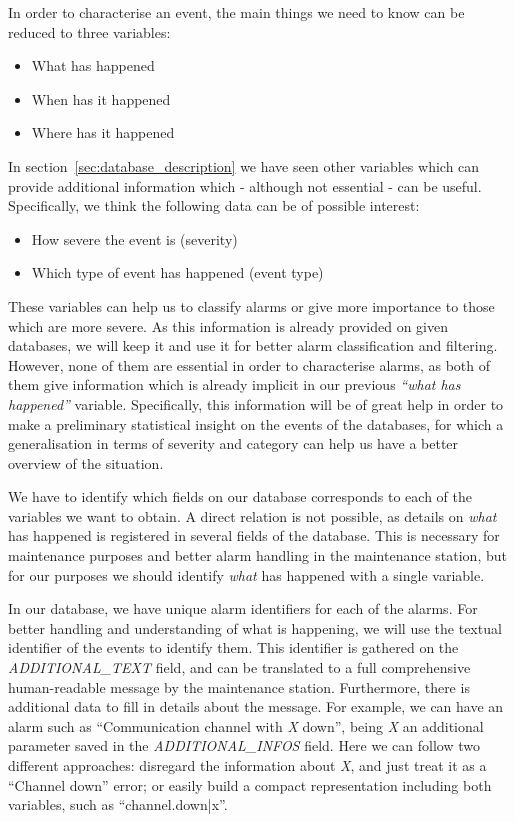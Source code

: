 \documentclass[a4paper,12pt]{article}
\begin{document}
In order to characterise an event, the main things we need to know can be reduced to three variables:
\begin{itemize}
\item What has happened
\item When has it happened
\item Where has it happened
\end{itemize}

In section~\ref{sec:database_description} we have seen other variables which can provide additional information which - although not essential - can be useful. Specifically, we think the following data can be of possible interest:

\begin{itemize}
\item How severe the event is (severity)
\item Which type of event has happened (event type)
\end{itemize}

These variables can help us to classify alarms or give more importance to those which are more severe. As this information is already provided on given databases, we will keep it and use it for better alarm classification and filtering. However, none of them are essential in order to characterise alarms, as both of them give information which is already implicit in our previous \emph{``what has happened''} variable. Specifically, this information will be of great help in order to make a preliminary statistical insight on the events of the databases, for which a generalisation in terms of severity and category can help us have a better overview of the situation.

We have to identify which fields on our database corresponds to each of the variables we want to obtain. A direct relation is not possible, as details on \emph{what} has happened is registered in several fields of the database. This is necessary for maintenance purposes and better alarm handling in the maintenance station, but for our purposes we should identify \emph{what} has happened with a single variable.

In our database, we have unique alarm identifiers for each of the alarms. For better handling and understanding of what is happening, we will use the textual identifier of the events to identify them. This identifier is gathered on the \emph{ADDITIONAL\_TEXT} field, and can be translated to a full comprehensive human-readable message by the maintenance station. Furthermore, there is additional data to fill in details about the message. For example, we can have an alarm such as ``Communication channel with \emph{X} down'', being \emph{X} an additional parameter saved in the \emph{ADDITIONAL\_INFOS} field. Here we can follow two different approaches: disregard the information about \emph{X}, and just treat it as a ``Channel down'' error; or easily build a compact representation including both variables, such as ``channel.down|x''.
\end{document}
